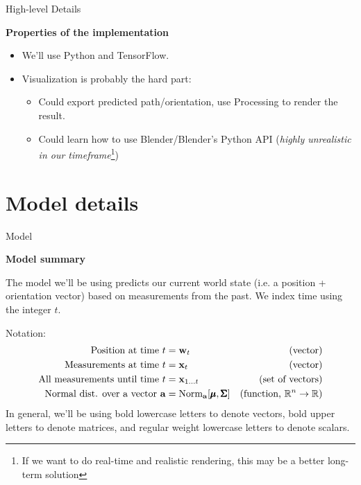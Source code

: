 \documentclass[10pt]{beamer}
\begin{document}
\begin{frame}{High-level Details}
	
	\textbf{Properties of the implementation}
	\begin{itemize}
		\item We'll use Python and TensorFlow.
		\item Visualization is probably the hard part:
		\begin{itemize}
			\item Could export predicted path/orientation, use Processing to render the result.
			\item Could learn how to use Blender/Blender's Python API (\emph{highly unrealistic in our timeframe}\footnote{If we want to do real-time and realistic rendering, this may be a better long-term solution})
		\end{itemize}
	\end{itemize}

\end{frame}

\section{Model details}
\begin{frame}{Model}
	
	\textbf{Model summary}
	
	The model we'll be using predicts our current world state (i.e. a position + orientation vector) based on measurements from the past. We index time using the integer $t$.
	
	Notation:
	\begin{align*}
	 \text{Position at time} \ t &= \mathbf{w}_t \hfill &\text{(vector)}\\
	\text{Measurements at time} \ t &= \mathbf{x}_t \hfill &\text{(vector)}\\
	\text{All measurements until time} \ t &= \mathbf{x}_{1...t} \hfill & \text{(set of vectors)}\\
	\text{Normal dist. over a vector $\mathbf{a}$} &= \text{Norm}_{\mathbf{a}}[\pmb{\mu}, \pmb{\Sigma}] \hfill &\text{(function, $\mathbb{R}^n \to \mathbb{R}$)}
	\end{align*}
	In general, we'll be using bold lowercase letters to denote vectors, bold upper letters to denote matrices, and regular weight lowercase letters to denote scalars.
	
\end{frame}
\end{document}
